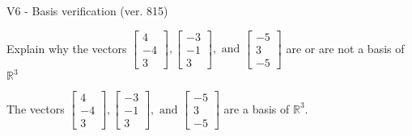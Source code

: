 \begin{exercise}
  \begin{exerciseTitle}V6 - Basis verification (ver. 815)\end{exerciseTitle}
  \begin{exerciseStatement}
    Explain why the vectors \(\left[\begin{array}{r}
4 \\
-4 \\
3
\end{array}\right] , \left[\begin{array}{r}
-3 \\
-1 \\
3
\end{array}\right] , \text{ and } \left[\begin{array}{r}
-5 \\
3 \\
-5
\end{array}\right]\) are or are not a basis of \(\mathbb{R}^3\)	


  \end{exerciseStatement}
  \begin{exerciseAnswer}
   The vectors \(\left[\begin{array}{r}
4 \\
-4 \\
3
\end{array}\right] , \left[\begin{array}{r}
-3 \\
-1 \\
3
\end{array}\right] , \text{ and } \left[\begin{array}{r}
-5 \\
3 \\
-5
\end{array}\right]\) 
  	 are  a basis of \(\mathbb{R}^3\).
  


  \end{exerciseAnswer}
\end{exercise}